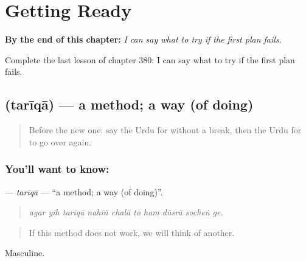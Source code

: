 
\chapter{Getting Ready}
\label{ch:ur-getting-ready}

\begin{chapteropening}
\textbf{By the end of this chapter:} \emph{I can say what to try if the first plan fails.}

Complete the last lesson of chapter 380: I can say what to try if the first plan fails.
\end{chapteropening}

\section[\texorpdfstring{\ur{طریقہ} (tarīqā)}{طریقہ (tarīqā)}]{ (tarīqā) — a method; a way (of doing)}

\label{lesson:UR-C380-tariqa}



\begin{quote}
Before the new one: say the Urdu for without a break, then the Urdu for to go over again.
\end{quote}

\subsection*{You'll want to know: }
\textbf{} — \emph{tarīqā} — \textquotedblleft{}a method; a way (of doing)\textquotedblright{}.

\begin{quote}
         
\end{quote}

\begin{quote}
\emph{agar yih tarīqā nahīṅ chalā to ham dūsrā socheṅ ge.}
\end{quote}

\begin{quote}
If this method does not work, we will think of another.
\end{quote}

Masculine.

